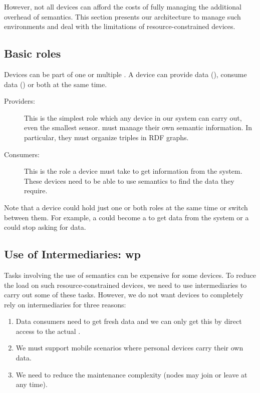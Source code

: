 However, not all devices can afford the costs of fully managing the additional overhead of semantics.
This section presents our architecture to manage such environments and deal with the limitations of resource-constrained devices.

\subsection{Basic roles}
Devices can be part of one or multiple \Spaces{}.
A device can provide data (\providers{}), consume data (\consumers{}) or both at the same time.

\begin{description}
\item[Providers:]
This is the simplest role which any device in our system can carry out, even the smallest sensor.
\providers{} must manage their own semantic information.
In particular, they must organize triples in RDF graphs.
\item[Consumers:]
This is the role a device must take to get information from the system.
These devices need to be able to use semantics to find the data they require.
\end{description}

Note that a device could hold just one or both roles at the same time or switch between them.
For example, a \provider{} could become a \consumer{} to get data from the system or a \consumer{} could stop asking for data.


\subsection{Use of Intermediaries: \acl{wp}}
Tasks involving the use of semantics can be expensive for some devices.
To reduce the load on such resource-constrained devices, we need to use intermediaries to carry out some of these tasks.
However, we do not want devices to completely rely on intermediaries for three reasons:
\begin{enumerate}
  \item Data consumers need to get fresh data and we can only get this by direct access to the actual \provider{}.
  \item We must support mobile scenarios where personal devices carry their own data.
  \item We need to reduce the maintenance complexity (nodes may join or leave at any time).
\end{enumerate}

